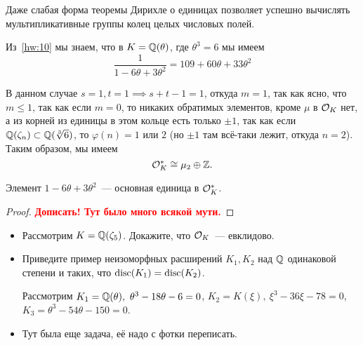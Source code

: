 	Даже слабая форма теоремы Дирихле о единицах позволяет успешно вычислять мультипликативные группы колец целых числовых полей. 

	\begin{example}
		Из~\ref{hw:10} мы знаем, что в $K = \mathbb{Q}(\theta)$, где $\theta^3 = 6$ мы имеем
		\[ \frac{1}{1 - 6 \theta + 3\theta^2} = 109 + 60\theta + 33\theta^2 \]

		В данном случае $s = 1, t = 1 \implies s + t - 1 = 1$, откуда $m = 1$, так как ясно, что $m \le 1$, так как если $m = 0$, то никаких обратимых элементов, кроме $\mu$ в $\mathcal{O}_{K}$ нет, а из корней из единицы в этом кольце есть только $\pm 1$, так как  если $\mathbb{Q}(\zeta_n) \subset \mathbb{Q}(\sqrt[3]{6})$, то $\varphi(n) = 1$ или $2$ (но $\pm 1$ там всё-таки лежит, откуда $n = 2$). Таким образом, мы имеем 
		\[
			\mathcal{O}_{K}^* \cong \mu_{2} \oplus \mathbb{Z}.
		\]
	\end{example}

	\begin{statement} 
		Элемент $1 - 6\theta + 3\theta^2$~--- основная единица в $\mathcal{O}_{K}^*$.
	\end{statement}
		
	\begin{proof}
		\bf{\textcolor{red}{Дописать! Тут было много всякой мути.}}
	\end{proof}

	\begin{homework}
	\begin{itemize}
		\item Рассмотрим $K = \mathbb{Q}(\zeta_{5})$. Докажите, что $\mathcal{O}_{K}$~--- евклидово. 

		\item Приведите пример неизоморфных расширений $K_1, K_2$ над $\mathbb{Q}$ одинаковой степени и таких, что $\operatorname{disc}(K_1) = \operatorname{disc}(K_2)$.

		Рассмотрим $K_1 = \mathbb{Q}(\theta), \ \theta^3 - 18\theta - 6 = 0$, $K_2 = K(\xi), \ \xi^3 - 36\xi - 78 = 0$, $K_3 = \theta^3 - 54\theta - 150 = 0$.

		\item Тут была еще задача, её надо с фотки переписать. 
	\end{itemize}
	\end{homework}




